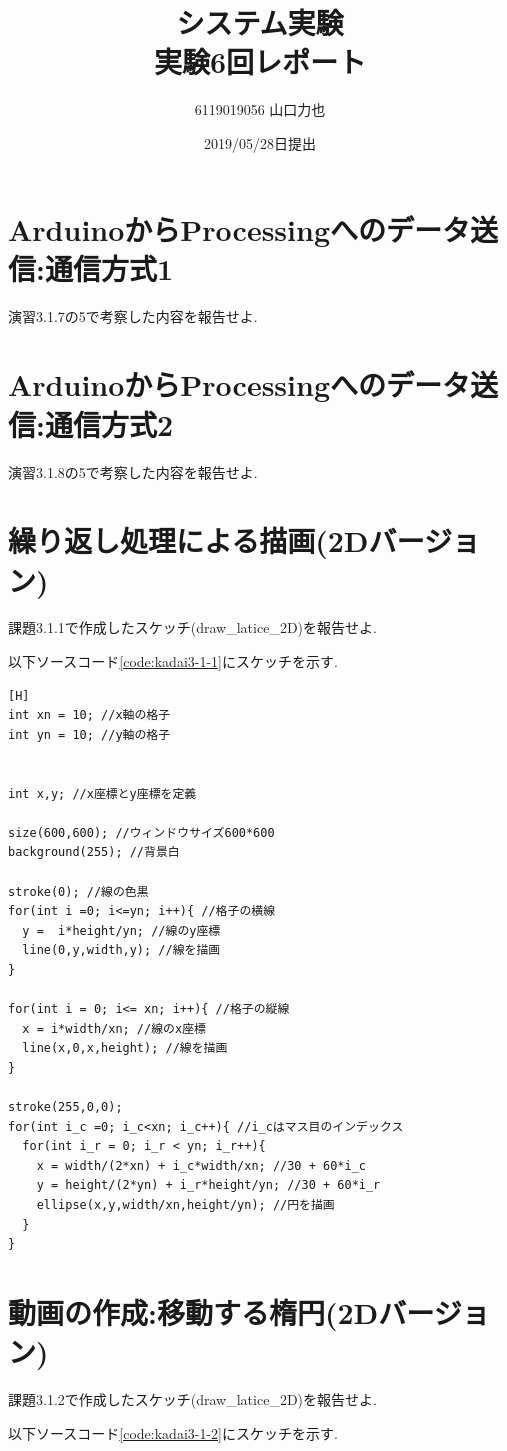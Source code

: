 \documentclass{jarticle}
\title{{システム実験}\\実験6回レポート}
\author{6119019056 山口力也}
\date{2019/05/28日提出}
\begin{document}
\maketitle

\section{ArduinoからProcessingへのデータ送信:通信方式1}
演習3.1.7の5で考察した内容を報告せよ.

\section{ArduinoからProcessingへのデータ送信:通信方式2}
演習3.1.8の5で考察した内容を報告せよ.

\section{繰り返し処理による描画(2Dバージョン)}
課題3.1.1で作成したスケッチ(draw\_latice\_2D)を報告せよ.

以下ソースコード\ref{code:kadai3-1-1}にスケッチを示す.

\begin{lstlisting}[caption = 課題3.1.1,label=code:kadai3-1-1][H]
int xn = 10; //x軸の格子
int yn = 10; //y軸の格子


int x,y; //x座標とy座標を定義

size(600,600); //ウィンドウサイズ600*600
background(255); //背景白

stroke(0); //線の色黒
for(int i =0; i<=yn; i++){ //格子の横線
  y =  i*height/yn; //線のy座標
  line(0,y,width,y); //線を描画
}

for(int i = 0; i<= xn; i++){ //格子の縦線
  x = i*width/xn; //線のx座標
  line(x,0,x,height); //線を描画
}

stroke(255,0,0);
for(int i_c =0; i_c<xn; i_c++){ //i_cはマス目のインデックス
  for(int i_r = 0; i_r < yn; i_r++){
    x = width/(2*xn) + i_c*width/xn; //30 + 60*i_c
    y = height/(2*yn) + i_r*height/yn; //30 + 60*i_r
    ellipse(x,y,width/xn,height/yn); //円を描画
  }
}
\end{lstlisting}

\section{動画の作成:移動する楕円(2Dバージョン)}
課題3.1.2で作成したスケッチ(draw\_latice\_2D)を報告せよ.

以下ソースコード\ref{code:kadai3-1-2}にスケッチを示す.
\end{document}
